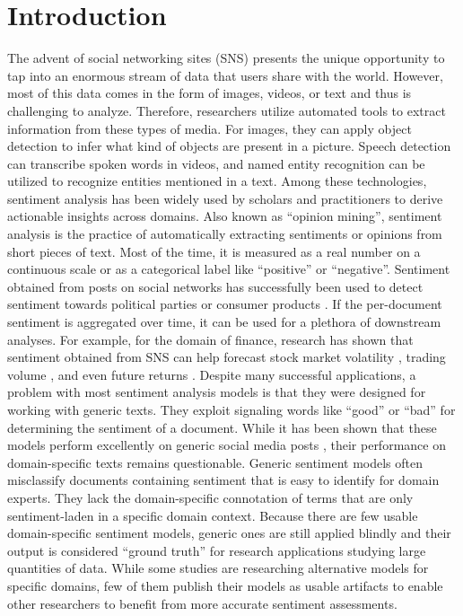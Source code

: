 \section{Introduction}

The advent of social networking sites (SNS) presents the unique opportunity to tap into an enormous stream of data that users share with the world. However, most of this data comes in the form of images, videos, or text and thus is challenging to analyze. Therefore, researchers utilize automated tools to extract information from these types of media. For images, they can apply object detection to infer what kind of objects are present in a picture. Speech detection can transcribe spoken words in videos, and named entity recognition can be utilized to recognize entities mentioned in a text. Among these technologies, sentiment analysis has been widely used by scholars and practitioners to derive actionable insights across domains. Also known as ``opinion mining'', sentiment analysis is the practice of automatically extracting sentiments or opinions from short pieces of text. Most of the time, it is measured as a real number on a continuous scale or as a categorical label like ``positive'' or ``negative''. Sentiment obtained from posts on social networks has successfully been used to detect sentiment towards political parties  or consumer products \cite{pontiki2016semeval}. If the per-document sentiment is aggregated over time, it can be used for a plethora of downstream analyses. For example, for the domain of finance, research has shown that sentiment obtained from SNS can help forecast stock market volatility , trading volume , and even future returns .\newline
Despite many successful applications, a problem with most sentiment analysis models is that they were designed for working with generic texts. They exploit signaling words like ``good'' or ``bad'' for determining the sentiment of a document. While it has been shown that these models perform excellently on generic social media posts \cite{al2020evaluating}, their performance on domain-specific texts remains questionable. Generic sentiment models often misclassify documents containing sentiment that is easy to identify for domain experts. They lack the domain-specific connotation of terms that are only sentiment-laden in a specific domain context. Because there are few usable domain-specific sentiment models, generic ones are still applied blindly and their output is considered ``ground truth'' for research applications studying large quantities of data. While some studies are researching alternative models for specific domains, few of them publish their models as usable artifacts to enable other researchers to benefit from more accurate sentiment assessments.

